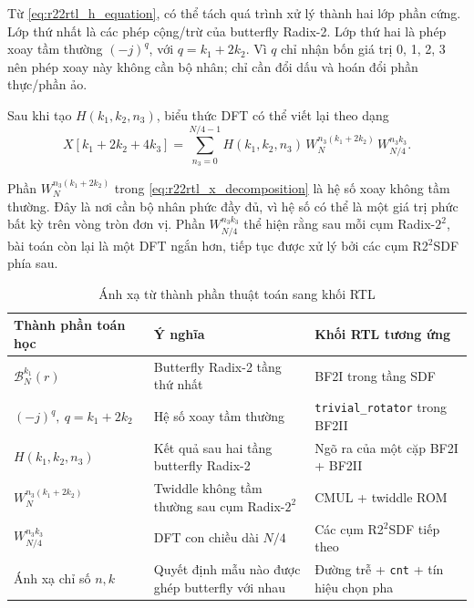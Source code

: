 \documentclass[12pt,a4paper]{report}
\numberwithin{equation}{chapter}
\begin{document}
Từ \eqref{eq:r22rtl_h_equation}, có thể tách quá trình xử lý thành hai lớp phần cứng. Lớp thứ nhất là các phép cộng/trừ của butterfly Radix-2. Lớp thứ hai là phép xoay tầm thường $(-j)^q$, với $q=k_1+2k_2$. Vì $q$ chỉ nhận bốn giá trị 0, 1, 2, 3 nên phép xoay này không cần bộ nhân; chỉ cần đổi dấu và hoán đổi phần thực/phần ảo.

Sau khi tạo $H(k_1,k_2,n_3)$, biểu thức DFT có thể viết lại theo dạng
\begin{equation}
    X[k_1+2k_2+4k_3]
    =\sum_{n_3=0}^{N/4-1}
    H(k_1,k_2,n_3)\,W_N^{n_3(k_1+2k_2)}\,W_{N/4}^{n_3k_3}.
\label{eq:r22rtl_x_decomposition}
\end{equation}

Phần $W_N^{n_3(k_1+2k_2)}$ trong \eqref{eq:r22rtl_x_decomposition} là hệ số xoay không tầm thường. Đây là nơi cần bộ nhân phức đầy đủ, vì hệ số có thể là một giá trị phức bất kỳ trên vòng tròn đơn vị. Phần $W_{N/4}^{n_3k_3}$ thể hiện rằng sau mỗi cụm Radix-$2^2$, bài toán còn lại là một DFT ngắn hơn, tiếp tục được xử lý bởi các cụm R2$^2$SDF phía sau.

\begin{table}[H]
    \centering
    \caption{Ánh xạ từ thành phần thuật toán sang khối RTL}
    \label{tab:r22rtl_algorithm_to_rtl}
    \begin{tabularx}{\textwidth}{>{\raggedright\arraybackslash}p{3.8cm}>{\raggedright\arraybackslash}p{4.8cm}X}
        \toprule
        \textbf{Thành phần toán học} & \textbf{Ý nghĩa} & \textbf{Khối RTL tương ứng} \\
        \midrule
        $\mathcal{B}_N^{k_1}(r)$ & Butterfly Radix-2 tầng thứ nhất & BF2I trong tầng SDF \\
        $(-j)^q,\ q=k_1+2k_2$ & Hệ số xoay tầm thường & \texttt{trivial\_rotator} trong BF2II \\
        $H(k_1,k_2,n_3)$ & Kết quả sau hai tầng butterfly Radix-2 & Ngõ ra của một cặp BF2I + BF2II \\
        $W_N^{n_3(k_1+2k_2)}$ & Twiddle không tầm thường sau cụm Radix-$2^2$ & CMUL + twiddle ROM \\
        $W_{N/4}^{n_3k_3}$ & DFT con chiều dài $N/4$ & Các cụm R2$^2$SDF tiếp theo \\
        Ánh xạ chỉ số $n,k$ & Quyết định mẫu nào được ghép butterfly với nhau & Đường trễ + \texttt{cnt} + tín hiệu chọn pha \\
        \bottomrule
    \end{tabularx}
\end{table}
\end{document}
